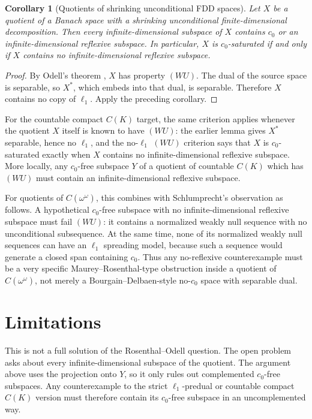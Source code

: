 \documentclass[11pt]{article}
\newtheorem*{corollary}{Corollary}
\begin{document}
\begin{corollary}[Quotients of shrinking unconditional FDD spaces]
Let \(X\) be a quotient of a Banach space with a shrinking unconditional finite-dimensional decomposition.  Then every infinite-dimensional subspace of \(X\) contains \(c_0\) or an infinite-dimensional reflexive subspace.  In particular, \(X\) is \(c_0\)-saturated if and only if \(X\) contains no infinite-dimensional reflexive subspace.
\end{corollary}

\begin{proof}
By Odell's theorem \cite{Odell}, \(X\) has property \((WU)\).  The dual of the source space is separable, so \(X^*\), which embeds into that dual, is separable.  Therefore \(X\) contains no copy of \(\ell_1\).  Apply the preceding corollary.
\end{proof}

For the countable compact \(C(K)\) target, the same criterion applies whenever the quotient \(X\) itself is known to have \((WU)\): the earlier lemma gives \(X^*\) separable, hence no \(\ell_1\), and the no-\(\ell_1\) \((WU)\) criterion says that \(X\) is \(c_0\)-saturated exactly when \(X\) contains no infinite-dimensional reflexive subspace.  More locally, any \(c_0\)-free subspace \(Y\) of a quotient of countable \(C(K)\) which has \((WU)\) must contain an infinite-dimensional reflexive subspace.

For quotients of \(C(\omega^\omega)\), this combines with Schlumprecht's observation as follows.  A hypothetical \(c_0\)-free subspace with no infinite-dimensional reflexive subspace must fail \((WU)\): it contains a normalized weakly null sequence with no unconditional subsequence.  At the same time, none of its normalized weakly null sequences can have an \(\ell_1\) spreading model, because such a sequence would generate a closed span containing \(c_0\).  Thus any no-reflexive counterexample must be a very specific Maurey--Rosenthal-type obstruction inside a quotient of \(C(\omega^\omega)\), not merely a Bourgain--Delbaen-style no-\(c_0\) space with separable dual.

\section*{Limitations}

This is not a full solution of the Rosenthal--Odell question.  The open problem asks about every infinite-dimensional subspace of the quotient.  The argument above uses the projection onto \(Y\), so it only rules out complemented \(c_0\)-free subspaces.  Any counterexample to the strict \(\ell_1\)-predual or countable compact \(C(K)\) version must therefore contain its \(c_0\)-free subspace in an uncomplemented way.
\end{document}
